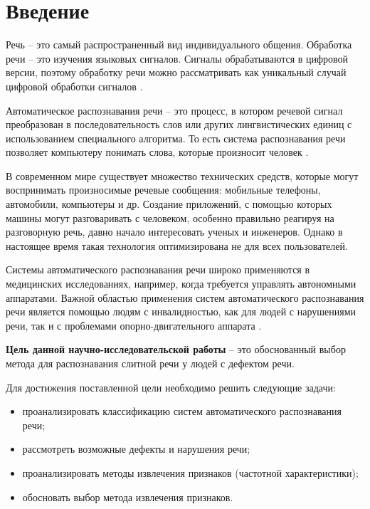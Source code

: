 \chapter*{Введение}
\setcounter{page}{2}

Речь -- это самый распространенный вид индивидуального общения. Обработка речи -- это изучения языковых сигналов. Сигналы обрабатываются в цифровой версии, поэтому обработку речи можно рассматривать как уникальный случай цифровой обработки сигналов \cite{vvegenie}.

Автоматическое распознавания речи -- это процесс, в котором речевой сигнал преобразован в последовательность слов или других лингвистических единиц с использованием специального алгоритма. То есть система распознавания речи позволяет компьютеру понимать слова, которые произносит человек \cite{vvegenie2}.

В современном мире существует множество технических средств, которые могут воспринимать произносимые речевые сообщения: мобильные телефоны, автомобили, компьютеры и др. Создание приложений, с помощью которых машины могут разговаривать с человеком, особенно правильно реагируя на разговорную речь, давно начало интересовать ученых и инженеров. Однако в настоящее время такая технология оптимизирована не для всех пользователей.

Системы автоматического распознавания речи широко применяются в медицинских исследованиях, например, когда требуется управлять автономными аппаратами. Важной областью применения систем автоматического распознавания речи является помощью людям с инвалидностью, как для людей с нарушениями речи, так и с проблемами опорно-двигательного аппарата \cite{vvegenie3}.

\textbf{Цель данной научно-исследовательской работы} -- это обоснованный выбор метода для распознавания слитной речи у людей с дефектом речи.

Для достижения поставленной цели необходимо решить следующие задачи:
\begin{itemize}
	\item проанализировать классификацию систем автоматического распознавания речи;
	\item рассмотреть возможные дефекты и нарушения речи;
	\item проанализировать методы извлечения признаков (частотной характеристики);
	\item обосновать выбор метода извлечения признаков.
\end{itemize}


